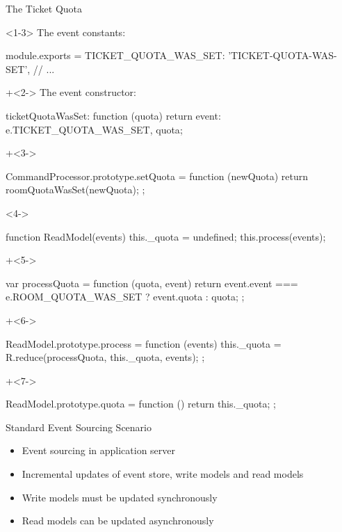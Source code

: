 \begin{frame}[fragile]{The Ticket Quota}

\begin{onlyenv}<1-3>
The event constants:

\begin{highlight}{1}
module.exports = {
  TICKET_QUOTA_WAS_SET: 'TICKET-QUOTA-WAS-SET',
  // ...
}
\end{highlight}

\onslide+<2->
The event constructor:

\begin{highlight}{2}
ticketQuotaWasSet: function (quota) {
    return {event: e.TICKET_QUOTA_WAS_SET, quota};
}
\end{highlight}

\onslide+<3->
\begin{highlight}{3}
CommandProcessor.prototype.setQuota = function (newQuota) {
  return roomQuotaWasSet(newQuota);
};
\end{highlight}
\end{onlyenv}

\begin{onlyenv}<4->
\begin{highlight}{4}
function ReadModel(events) {
  this._quota = undefined;
  this.process(events);
}
\end{highlight}
\onslide+<5->
\begin{highlight}{5}
var processQuota = function (quota, event) { 
  return event.event === e.ROOM_QUOTA_WAS_SET ? event.quota : quota;
};
\end{highlight}
\onslide+<6->
\begin{highlight}{6}
ReadModel.prototype.process = function (events) {
  this._quota = R.reduce(processQuota, this._quota, events);
};
\end{highlight}
\onslide+<7->
\begin{highlight}{7}
ReadModel.prototype.quota = function () {
  return this._quota;
};
\end{highlight}
\end{onlyenv}

\end{frame}


\begin{frame}[fragile]{Standard Event Sourcing Scenario}

\begin{itemize}
\item Event sourcing in application server
\item Incremental updates of event store, write models and read models
\item Write models must be updated synchronously
\item Read models can be updated asynchronously
\end{itemize}

\end{frame}

